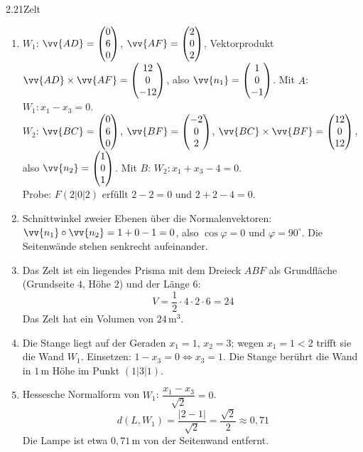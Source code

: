 \begin{loesung}{2.21}{Zelt}
\begin{enumerate}[label=\alph*)]
  \item $W_1$: $\vv{AD} = \begin{pmatrix} 0\\ 6\\ 0\end{pmatrix}$, $\vv{AF} = \begin{pmatrix} 2\\ 0\\ 2\end{pmatrix}$, Vektorprodukt $\vv{AD}\times\vv{AF} = \begin{pmatrix} 12\\ 0\\ -12\end{pmatrix}$, also $\vv{n_1} = \begin{pmatrix} 1\\ 0\\ -1\end{pmatrix}$. Mit $A$: $W_1: x_1-x_3 = 0$.\\
  $W_2$: $\vv{BC} = \begin{pmatrix} 0\\ 6\\ 0\end{pmatrix}$, $\vv{BF} = \begin{pmatrix} -2\\ 0\\ 2\end{pmatrix}$, $\vv{BC}\times\vv{BF} = \begin{pmatrix} 12\\ 0\\ 12\end{pmatrix}$, also $\vv{n_2} = \begin{pmatrix} 1\\ 0\\ 1\end{pmatrix}$. Mit $B$: $W_2: x_1+x_3-4 = 0$.\\
  Probe: $F(2|0|2)$ erfüllt $2-2=0$ und $2+2-4=0$. \checkmark
  \item Schnittwinkel zweier Ebenen über die Normalenvektoren: $\vv{n_1}\circ\vv{n_2} = 1+0-1 = 0$, also $\cos{\varphi} = 0$ und $\varphi = 90^\circ$. Die Seitenwände stehen senkrecht aufeinander.
  \item Das Zelt ist ein liegendes Prisma mit dem Dreieck $ABF$ als Grundfläche (Grundseite $4$, Höhe $2$) und der Länge $6$:
  \[V = \dfrac{1}{2}\cdot 4\cdot 2\cdot 6 = 24\]
  Das Zelt hat ein Volumen von $24\,\text{m}^3$.
  \item Die Stange liegt auf der Geraden $x_1 = 1$, $x_2 = 3$; wegen $x_1 = 1<2$ trifft sie die Wand $W_1$. Einsetzen: $1-x_3 = 0\Longleftrightarrow x_3 = 1$. Die Stange berührt die Wand in $1\,\text{m}$ Höhe im Punkt $(1|3|1)$.
  \item Hessesche Normalform von $W_1$: $\dfrac{x_1-x_3}{\sqrt{2}} = 0$.
  \[d(L,W_1) = \dfrac{|2-1|}{\sqrt{2}} = \dfrac{\sqrt{2}}{2}\approx 0{,}71\]
  Die Lampe ist etwa $0{,}71\,\text{m}$ von der Seitenwand entfernt.
\end{enumerate}
\end{loesung}

